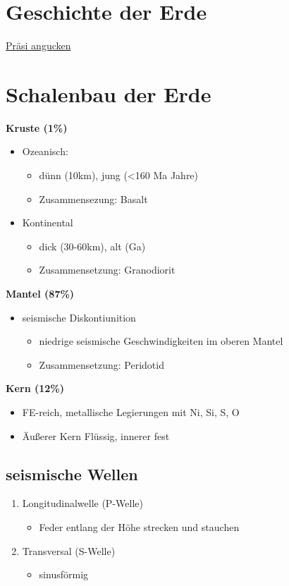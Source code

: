 \documentclass[a4,12pt]{scrreprt}
\begin{document}
\section{Geschichte der Erde}

\href{file:/home/joni/Schreibtisch/Uni/Mittschriften/System_Erde/Bilder/Erdentstehung}{Präsi angucken}

\newpage
\section{Schalenbau der Erde}

\textbf{Kruste (1\%)}
\begin{itemize}
\item Ozeanisch:
\begin{itemize}
\item dünn (10km), jung (<160 Ma Jahre)
\item Zusammensezung: Basalt
\end{itemize}
\item Kontinental
\begin{itemize}
\item dick (30-60km), alt (Ga)
\item Zusammensetzung: Granodiorit
\\
\end{itemize}
\end{itemize}

\textbf{Mantel (87\%)}
\begin{itemize}
\item seismische Diskontiunition
\begin{itemize}
\item niedrige seismische Geschwindigkeiten im oberen Mantel
\item Zusammensetzung: Peridotid
\\
\end{itemize}
\end{itemize}

\textbf{Kern (12\%)}
\begin{itemize}
\item FE-reich, metallische Legierungen mit Ni, Si, S, O
\item Äußerer Kern Flüssig, innerer fest
\end{itemize}

\subsection{seismische Wellen}
\begin{enumerate}
\item Longitudinalwelle (P-Welle)
\begin{itemize}
\item Feder entlang der Höhe strecken und stauchen
\end{itemize}
\item Transversal (S-Welle)
\begin{itemize}
\item sinusförmig
\end{itemize}
\end{enumerate}
\end{document}

